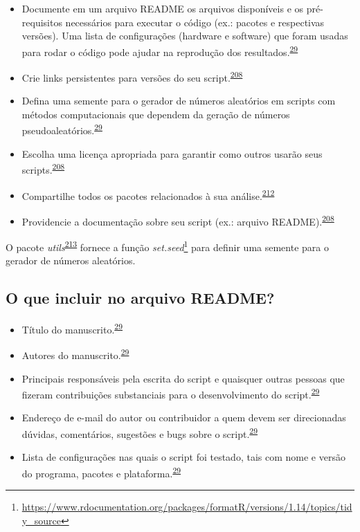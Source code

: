 \documentclass[
  a4paper,
]{book}
\renewcommand{\href}[2]{#2\footnote{\url{#1}}}
\newenvironment{infobox}[1]
  {
  \begin{itemize}
  \renewcommand{\labelitemi}{
    \raisebox{-.7\height}[0pt][0pt]{
      {\setkeys{Gin}{width=3em,keepaspectratio}
        \texttt{[image: \#1]}}
    }
  }
  \setlength{\fboxsep}{1em}
  \begin{blackbox}
  \item
  }
  {
  \end{blackbox}
  \end{itemize}
  }
\begin{document}
\begin{itemize}
\item
  Documente em um arquivo README os arquivos disponíveis e os pré-requisitos necessários para executar o código (ex.: pacotes e respectivas versões). Uma lista de configurações (hardware e software) que foram usadas para rodar o código pode ajudar na reprodução dos resultados.\textsuperscript{\protect\hyperlink{ref-hofner2015}{29}}
\item
  Crie links persistentes para versões do seu script.\textsuperscript{\protect\hyperlink{ref-Eglen2017}{208}}
\item
  Defina uma semente para o gerador de números aleatórios em scripts com métodos computacionais que dependem da geração de números pseudoaleatórios.\textsuperscript{\protect\hyperlink{ref-hofner2015}{29}}
\item
  Escolha uma licença apropriada para garantir como outros usarão seus scripts.\textsuperscript{\protect\hyperlink{ref-Eglen2017}{208}}
\item
  Compartilhe todos os pacotes relacionados à sua análise.\textsuperscript{\protect\hyperlink{ref-Zhao2023}{212}}
\item
  Providencie a documentação sobre seu script (ex.: arquivo README).\textsuperscript{\protect\hyperlink{ref-Eglen2017}{208}}
\end{itemize}

\begin{infobox}{images/Rlogo}
O pacote \emph{utils}\textsuperscript{\protect\hyperlink{ref-utils}{213}} fornece a função \href{https://www.rdocumentation.org/packages/formatR/versions/1.14/topics/tidy_source}{\emph{set.seed}} para definir uma semente para o gerador de números aleatórios.

\end{infobox}

\hypertarget{o-que-incluir-no-arquivo-readme}{%
\subsection{O que incluir no arquivo README?}\label{o-que-incluir-no-arquivo-readme}}

\begin{itemize}
\item
  Título do manuscrito.\textsuperscript{\protect\hyperlink{ref-hofner2015}{29}}
\item
  Autores do manuscrito.\textsuperscript{\protect\hyperlink{ref-hofner2015}{29}}
\item
  Principais responsáveis pela escrita do script e quaisquer outras pessoas que fizeram contribuições substanciais para o desenvolvimento do script.\textsuperscript{\protect\hyperlink{ref-hofner2015}{29}}
\item
  Endereço de e-mail do autor ou contribuidor a quem devem ser direcionadas dúvidas, comentários, sugestões e bugs sobre o script.\textsuperscript{\protect\hyperlink{ref-hofner2015}{29}}
\item
  Lista de configurações nas quais o script foi testado, tais com nome e versão do programa, pacotes e plataforma.\textsuperscript{\protect\hyperlink{ref-hofner2015}{29}}
\end{itemize}
\end{document}
